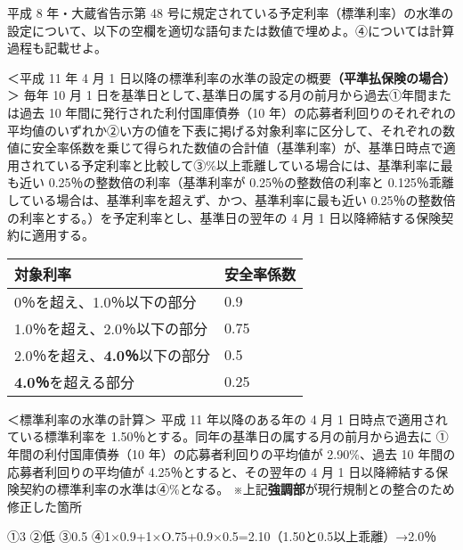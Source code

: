 \documentclass[report,gutter=10mm,fore-edge=10mm,uplatex,dvipdfmx]{jlreq}
\begin{document}

平成 8 年・大蔵省告示第 48
号に規定されている予定利率（標準利率）の水準の設定について、以下の空欄を適切な語句または数値で埋めよ。④については計算過程も記載せよ。

＜平成 11 年 4 月 1
日以降の標準利率の水準の設定の概要\textbf{（平準払保険の場合）}＞ 毎年
10 月 1 日を基準日として､基準日の属する月の前月から過去①年間または過去
10 年間に発行された利付国庫債券（10
年）の応募者利回りのそれぞれの平均値のいずれか②い方の値を下表に掲げる対象利率に区分して、それぞれの数値に安全率係数を乗じて得られた数値の合計値（基準利率）が、基準日時点で適用されている予定利率と比較して③\%以上乖離している場合には、基準利率に最も近い
0.25％の整数倍の利率（基準利率が 0.25％の整数倍の利率と
0.125％乖離している場合は、基準利率を超えず、かつ、基準利率に最も近い
0.25％の整数倍の利率とする。）を予定利率とし、基準日の翌年の 4 月 1
日以降締結する保険契約に適用する。

\begin{longtable}[]{@{}ll@{}}
\toprule
対象利率 & 安全率係数\tabularnewline
\midrule
\endhead
0％を超え、1.0％以下の部分 & 0.9\tabularnewline
1.0％を超え、2.0％以下の部分 & 0.75\tabularnewline
2.0％を超え、\textbf{4.0％}以下の部分 & 0.5\tabularnewline
\textbf{4.0％}を超える部分 & 0.25\tabularnewline
\bottomrule
\end{longtable}

＜標準利率の水準の計算＞ 平成 11 年以降のある年の 4 月 1
日時点で適用されている標準利率を
1.50％とする。同年の基準日の属する月の前月から過去に
①年間の利付国庫債券（10 年）の応募者利回りの平均値が 2.90\%、過去 10
年間の応募者利回りの平均値が 4.25％とすると、その翌年の 4 月 1
日以降締結する保険契約の標準利率の水準は④\%となる。
※上記\textbf{強調部}が現行規制との整合のため修正した箇所


①3 ②低 ③0.5 ④1×0.9+1×O.75+0.9×0.5=2.10（1.50と0.5以上乖離）→2.0％






\end{document}
